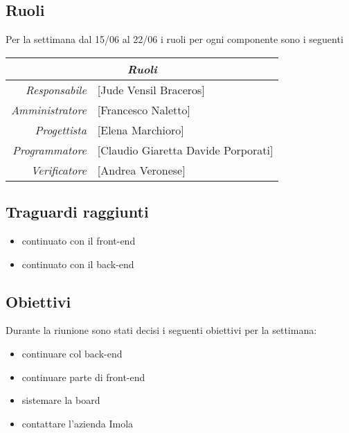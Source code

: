 \documentclass[12pt]{article}
\begin{document}
\subsection{Ruoli}
Per la settimana dal 15/06 al 22/06 i ruoli per ogni componente sono i seguenti
\\
\begin{tabular}{r | l}
    \multicolumn{2}{c}{\textit{Ruoli}}\\
    \hline
        \textit{Responsabile} &
        [Jude Vensil Braceros]\makecell{}\\
        \textit{Amministratore} &
        [Francesco Naletto]\makecell{}\\
        \textit{Progettista} &
        [Elena Marchioro]\makecell{}\\
        \textit{Programmatore} &
        [Claudio Giaretta Davide Porporati]\makecell{}\\
        \textit{Verificatore} & 
        [Andrea Veronese]\makecell{}\\
\end{tabular}

\subsection{Traguardi raggiunti}
\begin{itemize}
    \item continuato con il front-end
    \item continuato con il back-end
    
\end{itemize}

\subsection{Obiettivi}
Durante la riunione sono stati decisi i seguenti obiettivi per la settimana:
\begin{itemize}
    \item continuare col back-end
    \item continuare parte di front-end
    \item sistemare la board
    \item contattare l’azienda Imola
    
\end{itemize}
\end{document}
